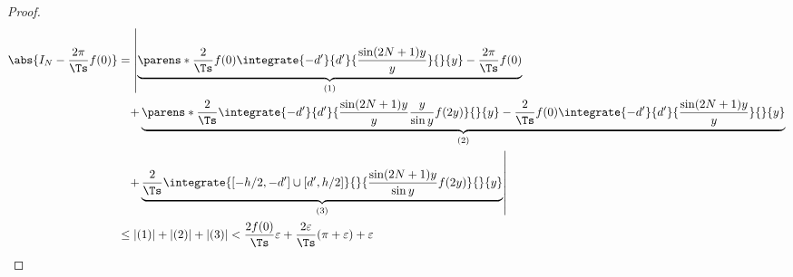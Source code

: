 \begin{proof}
            \begin{align*}
                \abs{I_N - \frac{2\pi}{\Ts} f(0)} &= \left|\underbrace{\parens*{\frac{2}{\Ts}f(0)\integrate{-d'}{d'}{\frac{\sin(2N+1)y}{y}}{}{y} - \frac{2\pi}{\Ts} f(0)}}_{(1)} \right. \\
                &\phantom{=} \left.+ \underbrace{\parens*{\frac{2}{\Ts}\integrate{-d'}{d'}{\frac{\sin(2N+1)y}{y}\frac{y}{\sin y}f(2y)}{}{y} - \frac{2}{\Ts}f(0)\integrate{-d'}{d'}{\frac{\sin(2N+1)y}{y}}{}{y}}}_{(2)} \right. \\
                &\phantom{=} \left.+ \underbrace{\frac{2}{\Ts}\integrate{[-h/2,-d']\cup[d',h/2]}{}{\frac{\sin(2N+1)y}{\sin y}f(2y)}{}{y}}_{(3)}\right| \\
                &\leq |(1)| + |(2)| + |(3)| < \frac{2f(0)}{\Ts}\varepsilon + \frac{2\varepsilon}{\Ts}(\pi+\varepsilon) + \varepsilon
            \end{align*}
        \end{proof}
